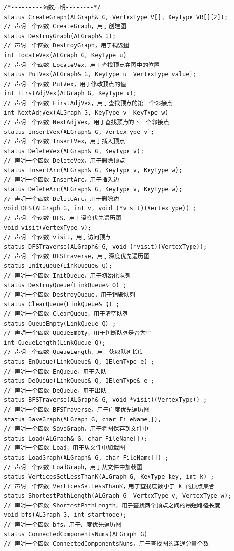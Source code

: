 \documentclass[supercite]{Experimental_Report}
\theoremstyle{definition}
\begin{document}
\begin{lstlisting}[title =相关定义,frame=none]
/*---------函数声明--------*/
status CreateGraph(ALGraph& G, VertexType V[], KeyType VR[][2]);
// 声明一个函数 CreateGraph，用于创建图
status DestroyGraph(ALGraph& G); 
// 声明一个函数 DestroyGraph，用于销毁图
int LocateVex(ALGraph G, KeyType u); 
// 声明一个函数 LocateVex，用于查找顶点在图中的位置
status PutVex(ALGraph& G, KeyType u, VertexType value); 
// 声明一个函数 PutVex，用于修改顶点的值
int FirstAdjVex(ALGraph G, KeyType u); 
// 声明一个函数 FirstAdjVex，用于查找顶点的第一个邻接点
int NextAdjVex(ALGraph G, KeyType v, KeyType w); 
// 声明一个函数 NextAdjVex，用于查找顶点的下一个邻接点
status InsertVex(ALGraph& G, VertexType v); 
// 声明一个函数 InsertVex，用于插入顶点
status DeleteVex(ALGraph& G, KeyType v); 
// 声明一个函数 DeleteVex，用于删除顶点
status InsertArc(ALGraph& G, KeyType v, KeyType w); 
// 声明一个函数 InsertArc，用于插入边
status DeleteArc(ALGraph& G, KeyType v, KeyType w); 
// 声明一个函数 DeleteArc，用于删除边
void DFS(ALGraph G, int v, void (*visit)(VertexType)) ; 
// 声明一个函数 DFS，用于深度优先遍历图
void visit(VertexType v); 
// 声明一个函数 visit，用于访问顶点
status DFSTraverse(ALGraph& G, void (*visit)(VertexType)); 
// 声明一个函数 DFSTraverse，用于深度优先遍历图
status InitQueue(LinkQueue& Q); 
// 声明一个函数 InitQueue，用于初始化队列
status DestroyQueue(LinkQueue& Q) ; 
// 声明一个函数 DestroyQueue，用于销毁队列
status ClearQueue(LinkQueue& Q) ; 
// 声明一个函数 ClearQueue，用于清空队列
status QueueEmpty(LinkQueue Q) ; 
// 声明一个函数 QueueEmpty，用于判断队列是否为空
int QueueLength(LinkQueue Q); 
// 声明一个函数 QueueLength，用于获取队列长度
status EnQueue(LinkQueue& Q, QElemType e) ; 
// 声明一个函数 EnQueue，用于入队
status DeQueue(LinkQueue& Q, QElemType& e); 
// 声明一个函数 DeQueue，用于出队
status BFSTraverse(ALGraph& G, void(*visit)(VertexType)) ; 
// 声明一个函数 BFSTraverse，用于广度优先遍历图
status SaveGraph(ALGraph G, char FileName[]); 
// 声明一个函数 SaveGraph，用于将图保存到文件中
status Load(ALGraph& G, char FileName[]); 
// 声明一个函数 Load，用于从文件中加载图
status LoadGraph(ALGraph& G, char FileName[]) ; 
// 声明一个函数 LoadGraph，用于从文件中加载图
status VerticesSetLessThanK(ALGraph G, KeyType key, int k) ; 
// 声明一个函数 VerticesSetLessThanK，用于查找度数小于 k 的顶点集合
status ShortestPathLength(ALGraph G, VertexType v, VertexType w); 
// 声明一个函数 ShortestPathLength，用于查找两个顶点之间的最短路径长度
void bfs(ALGraph G, int startnode); 
// 声明一个函数 bfs，用于广度优先遍历图
status ConnectedComponentsNums(ALGraph G); 
// 声明一个函数 ConnectedComponentsNums，用于查找图的连通分量个数
\end{lstlisting}
\end{document}
